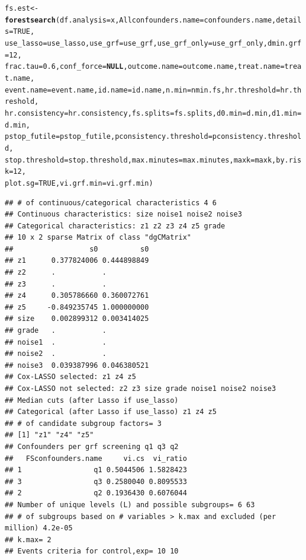 \documentclass[smallextended]{svjour3}
\makeatletter
\newcommand{\hlnum}[1]{\textcolor[rgb]{0.686,0.059,0.569}{#1}}%
\newcommand{\hlstd}[1]{\textcolor[rgb]{0.345,0.345,0.345}{#1}}%
\newcommand{\hlkwa}[1]{\textcolor[rgb]{0.161,0.373,0.58}{\textbf{#1}}}%
\newcommand{\hlkwb}[1]{\textcolor[rgb]{0.69,0.353,0.396}{#1}}%
\newcommand{\hlkwc}[1]{\textcolor[rgb]{0.333,0.667,0.333}{#1}}%
\newcommand{\hlkwd}[1]{\textcolor[rgb]{0.737,0.353,0.396}{\textbf{#1}}}%
\newenvironment{kframe}{%
 \def\at@end@of@kframe{}%
 \ifinner\ifhmode%
  \def\at@end@of@kframe{\end{minipage}}%
  \begin{minipage}{\columnwidth}%
 \fi\fi%
 \def\FrameCommand##1{\hskip\@totalleftmargin \hskip-\fboxsep
 \colorbox{shadecolor}{##1}\hskip-\fboxsep
     \hskip-\linewidth \hskip-\@totalleftmargin \hskip\columnwidth}%
 \MakeFramed {\advance\hsize-\width
   \@totalleftmargin\z@ \linewidth\hsize
   \@setminipage}}%
 {\par\unskip\endMakeFramed%
 \at@end@of@kframe}
\newenvironment{knitrout}{}{} %
\makeatother
\begin{document}
\begin{knitrout}
\begin{kframe}
\begin{alltt}
\hlstd{fs.est} \hlkwb{<-} \hlkwd{forestsearch}\hlstd{(}\hlkwc{df.analysis} \hlstd{= x,} \hlkwc{Allconfounders.name} \hlstd{= confounders.name,} \hlkwc{details} \hlstd{=} \hlnum{TRUE}\hlstd{,}
    \hlkwc{use_lasso} \hlstd{= use_lasso,} \hlkwc{use_grf} \hlstd{= use_grf,} \hlkwc{use_grf_only} \hlstd{= use_grf_only,} \hlkwc{dmin.grf} \hlstd{=} \hlnum{12}\hlstd{,}
    \hlkwc{frac.tau} \hlstd{=} \hlnum{0.6}\hlstd{,} \hlkwc{conf_force} \hlstd{=} \hlkwa{NULL}\hlstd{,} \hlkwc{outcome.name} \hlstd{= outcome.name,} \hlkwc{treat.name} \hlstd{= treat.name,}
    \hlkwc{event.name} \hlstd{= event.name,} \hlkwc{id.name} \hlstd{= id.name,} \hlkwc{n.min} \hlstd{= nmin.fs,} \hlkwc{hr.threshold} \hlstd{= hr.threshold,}
    \hlkwc{hr.consistency} \hlstd{= hr.consistency,} \hlkwc{fs.splits} \hlstd{= fs.splits,} \hlkwc{d0.min} \hlstd{= d.min,} \hlkwc{d1.min} \hlstd{= d.min,}
    \hlkwc{pstop_futile} \hlstd{= pstop_futile,} \hlkwc{pconsistency.threshold} \hlstd{= pconsistency.threshold,}
    \hlkwc{stop.threshold} \hlstd{= stop.threshold,} \hlkwc{max.minutes} \hlstd{= max.minutes,} \hlkwc{maxk} \hlstd{= maxk,} \hlkwc{by.risk} \hlstd{=} \hlnum{12}\hlstd{,}
    \hlkwc{plot.sg} \hlstd{=} \hlnum{TRUE}\hlstd{,} \hlkwc{vi.grf.min} \hlstd{= vi.grf.min)}
\end{alltt}
\begin{verbatim}
## # of continuous/categorical characteristics 4 6 
## Continuous characteristics: size noise1 noise2 noise3 
## Categorical characteristics: z1 z2 z3 z4 z5 grade 
## 10 x 2 sparse Matrix of class "dgCMatrix"
##                  s0          s0
## z1      0.377824006 0.444898849
## z2      .           .          
## z3      .           .          
## z4      0.305786660 0.360072761
## z5     -0.849235745 1.000000000
## size    0.002899312 0.003414025
## grade   .           .          
## noise1  .           .          
## noise2  .           .          
## noise3  0.039387996 0.046380521
## Cox-LASSO selected: z1 z4 z5 
## Cox-LASSO not selected: z2 z3 size grade noise1 noise2 noise3 
## Median cuts (after Lasso if use_lasso) 
## Categorical (after Lasso if use_lasso) z1 z4 z5 
## # of candidate subgroup factors= 3 
## [1] "z1" "z4" "z5"
## Confounders per grf screening q1 q3 q2 
##   FSconfounders.name     vi.cs  vi_ratio
## 1                 q1 0.5044506 1.5828423
## 3                 q3 0.2580040 0.8095533
## 2                 q2 0.1936430 0.6076044
## Number of unique levels (L) and possible subgroups= 6 63 
## # of subgroups based on # variables > k.max and excluded (per million) 4.2e-05 
## k.max= 2 
## Events criteria for control,exp= 10 10 

\end{verbatim}
\end{kframe}
\end{knitrout}
\end{document}
